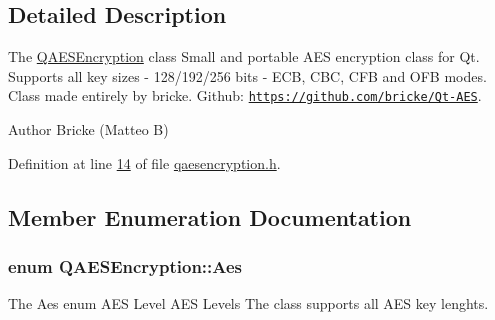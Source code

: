 \subsection{Detailed Description}
The \hyperlink{class_q_a_e_s_encryption}{Q\+A\+E\+S\+Encryption} class Small and portable A\+ES encryption class for Qt. Supports all key sizes -\/ 128/192/256 bits -\/ E\+CB, C\+BC, C\+FB and O\+FB modes. Class made entirely by bricke. Github\+: \href{https://github.com/bricke/Qt-AES}{\tt https\+://github.\+com/bricke/\+Qt-\/\+A\+ES}. 

\begin{DoxyAuthor}{Author}
Bricke (Matteo B) 
\end{DoxyAuthor}


Definition at line \hyperlink{qaesencryption_8h_source_l00014}{14} of file \hyperlink{qaesencryption_8h_source}{qaesencryption.\+h}.



\subsection{Member Enumeration Documentation}
\subsubsection[{\texorpdfstring{Aes}{Aes}}]{\setlength{\rightskip}{0pt plus 5cm}enum {\bf Q\+A\+E\+S\+Encryption\+::\+Aes}}\hypertarget{class_q_a_e_s_encryption_abe48208f4f6c7d68e6a10b49b9d0b7bd}{}\label{class_q_a_e_s_encryption_abe48208f4f6c7d68e6a10b49b9d0b7bd}


The Aes enum A\+ES Level A\+ES Levels The class supports all A\+ES key lenghts. 

